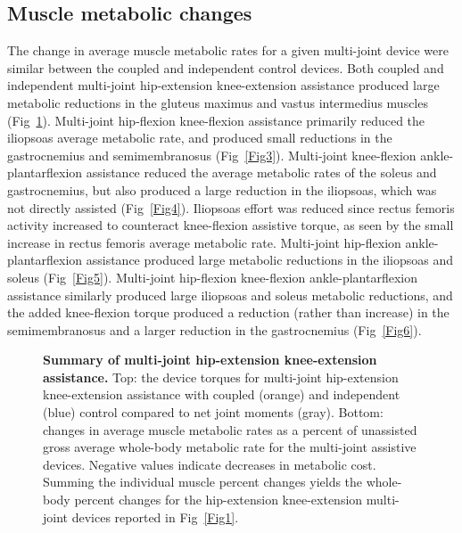 \documentclass[10pt,letterpaper]{article}
\begin{document}
\subsection*{Muscle metabolic changes}
The change in average muscle metabolic rates for a given multi-joint device were similar between the coupled and independent control devices. Both coupled and independent multi-joint hip-extension knee-extension assistance produced large metabolic reductions in the gluteus maximus and vastus intermedius muscles (Fig~\ref{Fig2}). Multi-joint hip-flexion knee-flexion assistance primarily reduced the iliopsoas average metabolic rate, and produced small reductions in the gastrocnemius and semimembranosus (Fig~\ref{Fig3}). Multi-joint knee-flexion ankle-plantarflexion assistance reduced the average metabolic rates of the soleus and gastrocnemius, but also produced a large reduction in the iliopsoas, which was not directly assisted (Fig~\ref{Fig4}). Iliopsoas effort was reduced since rectus femoris activity increased to counteract knee-flexion assistive torque, as seen by the small increase in rectus femoris average metabolic rate. Multi-joint hip-flexion ankle-plantarflexion assistance produced large metabolic reductions in the iliopsoas and soleus (Fig~\ref{Fig5}). Multi-joint hip-flexion knee-flexion ankle-plantarflexion assistance similarly produced large iliopsoas and soleus metabolic reductions, and the added knee-flexion torque produced a reduction (rather than increase) in the semimembranosus and a larger reduction in the gastrocnemius (Fig~\ref{Fig6}).

\begin{figure}[!h]
\begin{adjustwidth}{-1in}{0in} %
    \centering
    \caption{{\bf Summary of multi-joint hip-extension knee-extension assistance.}
        Top: the device torques for multi-joint hip-extension knee-extension assistance with coupled (orange) and independent (blue) control compared to net joint moments (gray). Bottom: changes in average muscle metabolic rates as a percent of unassisted gross average whole-body metabolic rate for the multi-joint assistive devices. Negative values indicate decreases in metabolic cost. Summing the individual muscle percent changes yields the whole-body percent changes for the hip-extension knee-extension multi-joint devices reported in Fig~\ref{Fig1}.}
\label{Fig2}
\end{adjustwidth}
\end{figure} 
\end{document}
